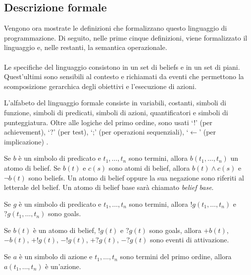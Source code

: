 \subsection{Descrizione formale}
Vengono ora mostrate le definizioni che formalizzano questo linguaggio di programmazione.
Di seguito, nelle prime cinque definizioni, viene formalizzato il linguaggio e, nelle restanti, la semantica operazionale.

\paragraph*{}
Le specifiche del linguaggio consistono in un set di beliefs e in un set di piani. Quest'ultimi sono sensibili al contesto e richiamati da eventi che permettono la scomposizione gerarchica degli obiettivi e l'esecuzione di azioni.

L'alfabeto del linguaggio formale consiste in variabili, costanti, simboli di funzione, simboli di predicati, simboli di azioni, quantificatori e simboli di punteggiatura. Oltre alle logiche del primo ordine, sono usati `!' (per achievement), `?' (per test), `;' (per operazioni sequenziali), `$\leftarrow$' (per implicazione) \cite{AgentSpeak}.

\smallskip
\begin{defn}
Se $b$ è un simbolo di predicato e $t_1, \ldots, t_n$ sono termini, allora $b(t_1, \ldots, t_n)$ un atomo di belief. Se $b(t)$ e $c(s)$ sono atomi di belief, allora $b(t) \wedge c(s)$ e $\neg b(t)$ sono beliefs. Un atomo di belief oppure la sua negazione sono riferiti al letterale del belief. Un atomo di belief base sarà chiamato \textit{belief base}.
\end{defn}

\smallskip
\begin{defn}
Se $g$ è un simbolo di predicato e $t_1, \ldots, t_n$ sono termini, allora $!g(t_1, \ldots, t_n)$ e $?g(t_1, \ldots, t_n)$ sono goals.
\end{defn}

\smallskip
\begin{defn}
Se $b(t)$ è un atomo di belief, $!g(t)$ e $?g(t)$ sono goals, allora $+b(t)$, $-b(t)$, $+!g(t)$, $-!g(t)$, $+?g(t)$, $-?g(t)$ sono eventi di attivazione.
\end{defn}

\smallskip
\begin{defn}
Se $a$ è un simbolo di azione e $t_1, \ldots, t_n$ sono termini del primo ordine, allora $a(t_1, \ldots, t_n)$ è un'azione.
\end{defn}

